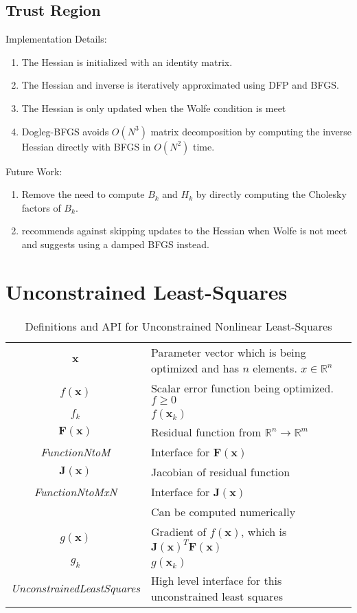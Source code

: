 \documentclass[peerreview,onecolumn]{IEEEtran}
\newcommand{\R}{\mathbb{R}}
\newenvironment{enumargin}[1]{\begin{enumerate}[leftmargin=#1\textwidth , rightmargin=#1\textwidth]}{\end{enumerate}}
\begin{document}
\subsection{Trust Region}

Implementation Details:
\begin{enumargin}{0.2}
    \item The Hessian is initialized with an identity matrix. 
	\item The Hessian and inverse is iteratively approximated using DFP and BFGS.
	\item The Hessian is only updated when the Wolfe condition is meet
	\item Dogleg-BFGS avoids $O(N^3)$ matrix decomposition by computing the inverse Hessian directly with BFGS in $O(N^2)$ time.
\end{enumargin}

Future Work:
\begin{enumargin}{0.2}
	\item Remove the need to compute $B_k$ and $H_k$ by directly computing the Cholesky factors of $B_k$. 
	\item \cite{numopt2006} recommends against skipping updates to the Hessian when Wolfe is not meet and suggests using a damped BFGS instead.
\end{enumargin}

\section{Unconstrained Least-Squares}
\begin{table*}[h]
\centering
\begin{tabular}{cl}
$\bm{x}$ & Parameter vector which is being optimized and has $n$ elements. $x \in \R^n$ \\
$f(\bm{x})$ & Scalar error function being optimized. $f \ge 0$ \\
$f_k$ & $f(\bm{x}_k)$ \\
$\bm{F}(\bm{x})$ &  Residual function from $\mathbb{R}^n \rightarrow \R^m$ \\
\textit{FunctionNtoM} & Interface for $\bm{F}(\bm{x})$ \\
$\bm{J}(\bm{x})$ & Jacobian of residual function \\
\textit{FunctionNtoMxN} & Interface for $\bm{J}(\bm{x})$ \\
 & Can be computed numerically \\
$g(\bm{x})$ & Gradient of $f(\bm{x})$, which is $\bm{J}(\bm{x})^T  \bm{F}(\bm{x})$ \\
$g_k$ & $g(\bm{x}_k)$ \\
\textit{UnconstrainedLeastSquares} & High level interface for this unconstrained least squares
\end{tabular}
\caption{\label{definitions:UNLS}Definitions and API for Unconstrained Nonlinear Least-Squares}
\end{table*}
\end{document}

